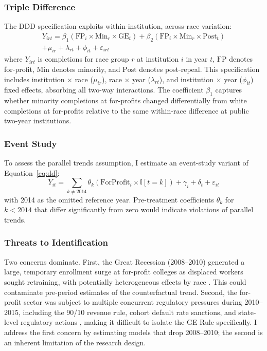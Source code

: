 \documentclass[12pt]{article}
\newcommand{\ind}{\mathbb{I}}
\begin{document}
\subsubsection*{Triple Difference} The DDD specification exploits within-institution, across-race variation:
\begin{multline}
Y_{irt} = \beta_1 (\text{FP}_i \times \text{Min}_r \times \text{GE}_t) + \beta_2 (\text{FP}_i \times \text{Min}_r \times \text{Post}_t) \\
+ \mu_{ir} + \lambda_{rt} + \phi_{it} + \varepsilon_{irt}
\label{eq:ddd}
\end{multline}
where $Y_{irt}$ is completions for race group $r$ at institution $i$ in year $t$, $\text{FP}$ denotes for-profit, $\text{Min}$ denotes minority, and $\text{Post}$ denotes post-repeal. This specification includes institution $\times$ race ($\mu_{ir}$), race $\times$ year ($\lambda_{rt}$), and institution $\times$ year ($\phi_{it}$) fixed effects, absorbing all two-way interactions. The coefficient $\beta_1$ captures whether minority completions at for-profits changed differentially from white completions at for-profits relative to the same within-race difference at public two-year institutions.

\subsubsection*{Event Study} To assess the parallel trends assumption, I estimate an event-study variant of Equation~\eqref{eq:dd}:
\begin{equation}
Y_{it} = \sum_{k \neq 2014} \theta_k (\text{ForProfit}_i \times \ind[t = k]) + \gamma_i + \delta_t + \varepsilon_{it}
\label{eq:event}
\end{equation}
with 2014 as the omitted reference year. Pre-treatment coefficients $\theta_k$ for $k < 2014$ that differ significantly from zero would indicate violations of parallel trends.

\subsubsection*{Threats to Identification} Two concerns dominate. First, the Great Recession (2008--2010) generated a large, temporary enrollment surge at for-profit colleges as displaced workers sought retraining, with potentially heterogeneous effects by race \citep{DemingGoldinKatz2012}. This could contaminate pre-period estimates of the counterfactual trend. Second, the for-profit sector was subject to multiple concurrent regulatory pressures during 2010--2015, including the 90/10 revenue rule, cohort default rate sanctions, and state-level regulatory actions \citep{DynerskiScott2021}, making it difficult to isolate the GE Rule specifically. I address the first concern by estimating models that drop 2008--2010; the second is an inherent limitation of the research design.
\end{document}
